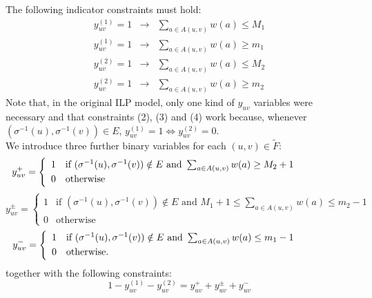 \documentclass{fundam}
\begin{document}
The following indicator constraints must hold: \\
%
\begin{equation}
 \begin{array}{lcl}
  y^{(1)}_{uv} = 1 & \to & \sum_{a \in A(u,v)} w(a) \leq M_1 \\[0.1cm]
  y^{(1)}_{uv} = 1 & \to & \sum_{a \in A(u,v)} w(a) \geq m_1
 \end{array}
\end{equation}
%
\begin{equation}
 \begin{array}{lcl}
  y^{(2)}_{uv} = 1 & \to & \sum_{a \in A(u,v)} w(a) \leq M_2 \\[0.1cm]
  y^{(2)}_{uv} = 1 & \to & \sum_{a \in A(u,v)} w(a) \geq m_2
 \end{array}
\end{equation}
%
Note that, in the original ILP model, only one kind of $y_{uv}$ variables were necessary and that constraints (2), (3) and (4) work because, whenever $(\sigma^{-1}(u),\sigma^{-1}(v)) \in E$, $y^{(1)}_{uv}=1 \iff y^{(2)}_{uv}=0$.
\\
We introduce three further binary variables for each $(u,v) \in \tilde{F}$:
\[
\hspace*{-1.7cm}
 y_{uv}^+ =
 \left\{\begin{array}{ll}
         1 & \mbox{if } (\sigma^{-1}(u),\sigma^{-1}(v)) \notin E
             \mbox{ and } \sum_{a \in A(u,v)} w(a) \geq M_2 + 1 \\[0.1cm]
         0 & \mbox{otherwise}
        \end{array}\right.
\]
\[
 y_{uv}^{\pm} =
 \left\{\begin{array}{ll}
         1 & \mbox{if } (\sigma^{-1}(u),\sigma^{-1}(v)) \notin E
             \mbox{ and } M_1 + 1 \leq \sum_{a \in A(u,v)} w(a) \leq m_2 -1 \\[0.1cm]
         0 & \mbox{otherwise}
        \end{array}\right.
\]
\[
\hspace*{-1.7cm}
 y_{uv}^- =
 \left\{\begin{array}{ll}
         1 & \mbox{if } (\sigma^{-1}(u),\sigma^{-1}(v)) \notin E
             \mbox{ and } \sum_{a \in A(u,v)} w(a) \leq m_1 - 1 \\[0.1cm]
         0 & \mbox{otherwise}.
        \end{array}\right.
\]
together with the following constraints:
%
\begin{equation}
 1 - y^{(1)}_{uv}-y^{(2)}_{uv} = y_{uv}^+ + y_{uv}^{\pm} + y_{uv}^-
 \label{eq:lnkng3}
\end{equation}
\end{document}
